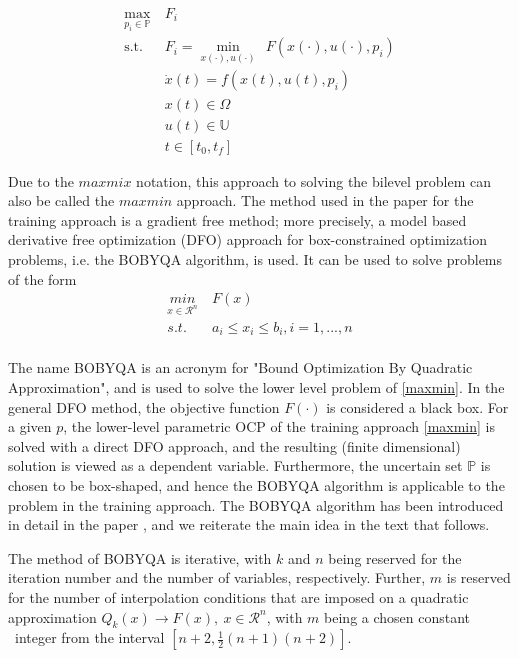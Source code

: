 \documentclass  [
  paper    = a4,
  BCOR     = 10mm,
  twoside,
  fontsize = 12pt,
  fleqn,
  toc      = bibnumbered,
  toc      = listofnumbered,
  numbers  = noendperiod,
  headings = normal,
  listof   = leveldown,
  version  = 3.03
]                                       {scrreprt}
\newcommand{\<}{\langle}
\renewcommand{\>}{\rangle}
\begin{document}
\begin{equation}
	\begin{aligned}
		\underset{p_i \in \mathbb{P}}{\max} \ & F_i \\
		\text{s.t.}\ \ & F_i = \underset{x(\cdot), u(\cdot)}{\min} \ \ F(x(\cdot), u(\cdot), p_i) \\
		& \dot{x} (t) = f(x(t), u(t), p_i)\\
		& x(t) \in \Omega \\
		& u(t) \in \mathbb{U} \\
		& t \in [t_0, t_f]
	\end{aligned}
	\label{maxmin}
\end{equation}


Due to the $max mix$ notation, this approach to solving the bilevel problem can also be called the $max min$ approach. The method used in the paper \cite{MatSch22} for the training approach is a gradient free method; more precisely, a model based derivative free optimization (DFO) approach for box-constrained optimization problems, i.e. the BOBYQA algorithm, is used. It can be used to solve problems of the form
\begin{equation}
	\begin{aligned}
		\underset{x \in \mathcal{R}^n}{min} & \  F(x)  \\ 
		s.t.  & \ a_i \leq x_i \leq b_i, i = 1, ..., n \\
	\end{aligned}
	\label{DFO_bc}
\end{equation}

The name BOBYQA is an acronym for "Bound Optimization By Quadratic Approximation", and is used to solve the lower level problem of \ref{maxmin}. In the general DFO method, the objective function $F(\cdot)$ is considered a black box. For a given $p$, the lower-level parametric OCP of the training approach \ref{maxmin} is solved with a direct DFO approach, and the resulting (finite dimensional) solution is viewed as a dependent variable. Furthermore, the uncertain set $\mathbb{P}$ is chosen to be box-shaped, and hence the BOBYQA algorithm is applicable to the problem in the training approach. The BOBYQA algorithm has been introduced in detail in the paper \cite{MicPow09}, and we reiterate the main idea in the text that follows.

The method of BOBYQA is iterative, with $k$ and $n$ being reserved for the iteration number and the number of variables, respectively. Further, $m$ is reserved for the number of interpolation conditions that are imposed on a quadratic approximation $Q_k(x) \xrightarrow{} F(x), \ x \in  \mathcal{R}^n$, with $m$ being a chosen constant  integer from the interval $[n+2, \frac{1}{2}(n+1)(n+2)]$. 
\end{document}
